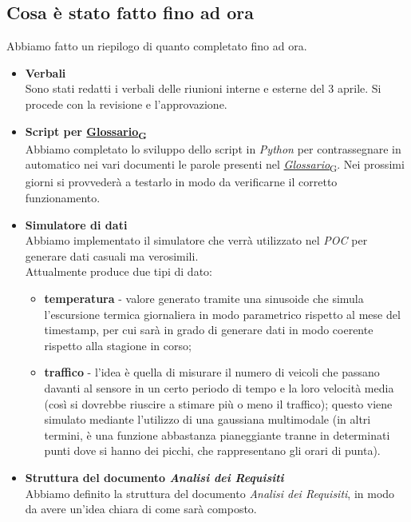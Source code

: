 \documentclass[italian,12pt]{article}
\begin{document}
\subsection{Cosa è stato fatto fino ad ora}
Abbiamo fatto un riepilogo di quanto completato fino ad ora.
\begin{itemize}
	\item \textbf{Verbali} \\
	Sono stati redatti i verbali delle riunioni interne e esterne del 3 aprile. Si procede con la revisione e l'approvazione.
	\item \textbf{Script per \href{https://7last.github.io/docs/rtb/documentazione-interna/glossario\#glossario}{Glossario\textsubscript{G}}} \\
	Abbiamo completato lo sviluppo dello script in \textit{Python} per contrassegnare in automatico nei vari documenti le parole presenti nel \href{https://7last.github.io/docs/rtb/documentazione-interna/glossario\#glossario}{\textit{Glossario}\textsubscript{G}}. Nei prossimi giorni si provvederà a testarlo in modo da verificarne il corretto funzionamento.
	\item \textbf{Simulatore di dati} \\
	Abbiamo implementato il simulatore che verrà utilizzato nel \textit{POC} per generare dati casuali ma verosimili. \\
	Attualmente produce due tipi di dato:
	\begin{itemize}
		\item \textbf{temperatura} - valore generato tramite una sinusoide che simula l'escursione termica giornaliera in modo parametrico rispetto al mese del timestamp, per cui sarà in grado di generare dati in modo coerente rispetto alla stagione in corso;
		\item \textbf{traffico} - l'idea è quella di misurare il numero di veicoli che passano davanti al sensore in un certo periodo di tempo e la loro velocità media (così si dovrebbe riuscire a stimare più o meno il traffico); questo viene simulato mediante l'utilizzo di una gaussiana multimodale (in altri termini, è una funzione abbastanza pianeggiante tranne in determinati punti dove si hanno dei picchi, che rappresentano gli orari di punta).
	\end{itemize}
	\item \textbf{Struttura del documento \textit{Analisi dei Requisiti}} \\
	Abbiamo definito la struttura del documento \textit{Analisi dei Requisiti}, in modo da avere un'idea chiara di come sarà composto.

\end{itemize}
\end{document}
